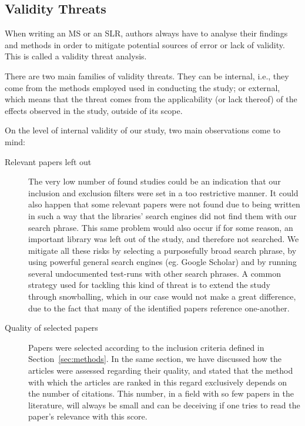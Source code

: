 

\subsection{Validity Threats}
\label{sub:validity_threats}

When writing an MS or an SLR, authors always have to analyse their
findings and methods in order to mitigate potential sources of error or
lack of validity. This is called a validity threat analysis.

There are two main families of validity threats. They can be internal,
i.e., they come from the methods employed used in conducting the study;
or external, which means that the threat comes from the applicability
(or lack thereof) of the effects observed in the study, outside of its
scope.

On the level of internal validity of our study, two main observations
come to mind:
\begin{description}
    
    \item[Relevant papers left out] The very low number of found studies
        could be an indication that our inclusion and exclusion filters
        were set in a too restrictive manner. It could also happen that
        some relevant papers were not found due to being written in such
        a way that the libraries' search engines did not find them with
        our search phrase. This same problem would also occur if for
        some reason, an important library was left out of the study, and
        therefore not searched. We mitigate all these risks by selecting
        a purposefully broad search phrase, by using powerful general
        search engines (eg.  Google Scholar) and by running several
        undocumented test-runs with other search phrases. A common
        strategy used for tackling this kind of threat is to extend the
        study through snowballing, which in our case would not make a
        great difference, due to the fact that many of the identified
        papers reference one-another.
    
    \item[Quality of selected papers] Papers were selected according to
        the inclusion criteria defined in Section~\ref{sec:methods}.  In
        the same section, we have discussed how the articles were
        assessed regarding their quality, and stated that the method
        with which the articles are ranked in this regard exclusively
        depends on the number of citations. This number, in a field with
        so few papers in the literature, will always be small and can be
        deceiving if one tries to read the paper's relevance with this
        score. 

\end{description}

